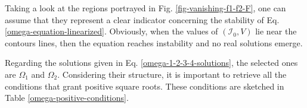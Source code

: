 Taking a look at the regions portrayed in Fig. \ref{fig-vanishing-f1-f2-F}, one can assume that they represent a clear indicator concerning the stability of Eq. \ref{omega-equation-linearized}. Obviously, when the values of $(\mathcal{I}_0,V)$ lie near the contours lines, then the equation reaches instability and no real solutions emerge.

Regarding the solutions given in Eq. \ref{omega-1-2-3-4-solutions}, the selected ones are $\Omega_1$ and $\Omega_2$. Considering their structure, it is important to retrieve all the conditions that grant positive square roots. These conditions are sketched in Table \ref{omega-positive-conditions}.
\begin{table}
    \centering
    \caption{The positivity conditions for the two solutions $\Omega_{1,2}$ given in Eq. \ref{omega-1-2-3-4-solutions}. The trivial solution $B=C=0$ has been dismissed.}
    \label{omega-positive-conditions}
\end{table}

